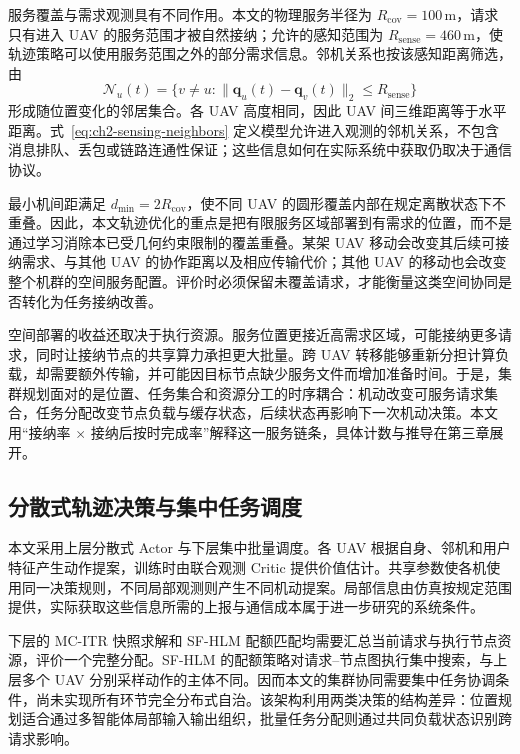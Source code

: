 服务覆盖与需求观测具有不同作用。本文的物理服务半径为 $R_{\mathrm{cov}}=100\,\mathrm{m}$，请求只有进入 UAV 的服务范围才被自然接纳；允许的感知范围为 $R_{\mathrm{sense}}=460\,\mathrm{m}$，使轨迹策略可以使用服务范围之外的部分需求信息。邻机关系也按该感知距离筛选，由
\begin{equation}
    \mathcal N_u(t)=\{v\neq u:\|\mathbf q_u(t)-\mathbf q_v(t)\|_2\leq R_{\mathrm{sense}}\}
    \label{eq:ch2-sensing-neighbors}
\end{equation}
形成随位置变化的邻居集合。各 UAV 高度相同，因此 UAV 间三维距离等于水平距离。式~\eqref{eq:ch2-sensing-neighbors} 定义模型允许进入观测的邻机关系，不包含消息排队、丢包或链路连通性保证；这些信息如何在实际系统中获取仍取决于通信协议。

最小机间距满足 $d_{\min}=2R_{\mathrm{cov}}$，使不同 UAV 的圆形覆盖内部在规定离散状态下不重叠。因此，本文轨迹优化的重点是把有限服务区域部署到有需求的位置，而不是通过学习消除本已受几何约束限制的覆盖重叠。某架 UAV 移动会改变其后续可接纳需求、与其他 UAV 的协作距离以及相应传输代价；其他 UAV 的移动也会改变整个机群的空间服务配置。评价时必须保留未覆盖请求，才能衡量这类空间协同是否转化为任务接纳改善。

空间部署的收益还取决于执行资源。服务位置更接近高需求区域，可能接纳更多请求，同时让接纳节点的共享算力承担更大批量。跨 UAV 转移能够重新分担计算负载，却需要额外传输，并可能因目标节点缺少服务文件而增加准备时间。于是，集群规划面对的是位置、任务集合和资源分工的时序耦合：机动改变可服务请求集合，任务分配改变节点负载与缓存状态，后续状态再影响下一次机动决策。本文用“接纳率 $\times$ 接纳后按时完成率”解释这一服务链条，具体计数与推导在第三章展开。

\subsection{分散式轨迹决策与集中任务调度}
\label{sec:ch2-swarm-coordination-architecture}

本文采用上层分散式 Actor 与下层集中批量调度。各 UAV 根据自身、邻机和用户特征产生动作提案，训练时由联合观测 Critic 提供价值估计。共享参数使各机使用同一决策规则，不同局部观测则产生不同机动提案。局部信息由仿真按规定范围提供，实际获取这些信息所需的上报与通信成本属于进一步研究的系统条件。

下层的 MC-ITR 快照求解和 SF-HLM 配额匹配均需要汇总当前请求与执行节点资源，评价一个完整分配。SF-HLM 的配额策略对请求--节点图执行集中搜索，与上层多个 UAV 分别采样动作的主体不同。因而本文的集群协同需要集中任务协调条件，尚未实现所有环节完全分布式自治。该架构利用两类决策的结构差异：位置规划适合通过多智能体局部输入输出组织，批量任务分配则通过共同负载状态识别跨请求影响。

